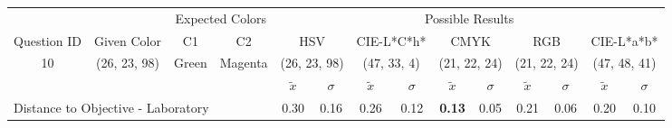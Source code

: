 \begin{table}[H]
  \resizebox{\textwidth}{!} {
  \begin{tabular}{lccccccccccccc}
    \hline
    \multicolumn{1}{c}{}                              &                                      & \multicolumn{2}{c}{Expected Colors}                   & \multicolumn{10}{c}{Possible Results}                                                                                                                                                                                                                                                                                        \\ \cline{3-14}
    \multicolumn{1}{c}{\multirow{-2}{*}{Question ID}} & \multirow{-2}{*}{Given Color}        & C1                       & C2                         & \multicolumn{2}{c}{HSV}                                        & \multicolumn{2}{c}{CIE-L*C*h*}                                 & \multicolumn{2}{c}{CMYK}                                       & \multicolumn{2}{c}{RGB}                                        & \multicolumn{2}{c}{CIE-L*a*b*}                                 \\ \hline
    \multicolumn{1}{c}{10}                             & \cellcolor[HTML]{0080FF}(26, 23, 98) & \multicolumn{1}{c|}{Green} & \multicolumn{1}{c|}{Magenta}  & \multicolumn{2}{c|}{\cellcolor[HTML]{0080FF}(26, 23, 98)}      & \multicolumn{2}{c|}{\cellcolor[HTML]{FF6F00}(47, 33, 4)}       & \multicolumn{2}{c|}{\cellcolor[HTML]{808080}(21, 22, 24)}       & \multicolumn{2}{c|}{\cellcolor[HTML]{808080}(21, 22, 24)}       & \multicolumn{2}{c|}{\cellcolor[HTML]{C9B2A2}(47, 48, 41)}       \\ \hline
                                                      & \multicolumn{1}{l}{}                 & \multicolumn{1}{l}{}     & \multicolumn{1}{l}{}       & \multicolumn{1}{c}{$\tilde{x}$} & \multicolumn{1}{c}{$\sigma$} & \multicolumn{1}{c}{$\tilde{x}$} & \multicolumn{1}{c}{$\sigma$} & \multicolumn{1}{c}{$\tilde{x}$} & \multicolumn{1}{c}{$\sigma$} & \multicolumn{1}{c}{$\tilde{x}$} & \multicolumn{1}{c}{$\sigma$} & \multicolumn{1}{c}{$\tilde{x}$} & \multicolumn{1}{c}{$\sigma$} \\ \hline
    \multicolumn{4}{l}{Distance to Objective - Laboratory}                                                                                           & \multicolumn{1}{|c}{0.30}       & \multicolumn{1}{c|}{0.16}    & \multicolumn{1}{|c}{0.26}       & \multicolumn{1}{c|}{0.12}    & \multicolumn{1}{|c}{\textbf{0.13}}       & \multicolumn{1}{c|}{0.05}    & \multicolumn{1}{|c}{0.21}       & \multicolumn{1}{c|}{0.06}    & \multicolumn{1}{|c}{0.20}       & \multicolumn{1}{c|}{0.10}    \\

\end{tabular}}
\end{table}
